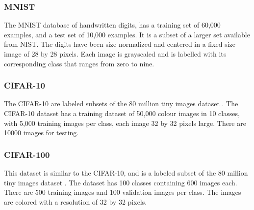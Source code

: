 \subsubsection{MNIST}
The MNIST database \cite{lecun-mnisthandwrittendigit-2010} of handwritten digits, has a training set of 60,000 examples, and a test set of 10,000 examples. It is a subset of a larger set available from NIST. The digits have been size-normalized and centered in a fixed-size image of 28 by 28 pixels. Each image is grayscaled and is labelled with its corresponding class that ranges from zero to nine.

\newline
\subsubsection{CIFAR-10}
The CIFAR-10 are labeled subsets of the 80 million tiny images dataset \cite{Torralba:2008:MTI:1444381.1444403}. The CIFAR-10 dataset has a training dataset of 50,000 colour images in 10 classes, with 5,000 training images per class, each image 32 by 32 pixels large. There are 10000 images for testing. 
\newline
\subsubsection{CIFAR-100}
This dataset is similar to the CIFAR-10, and is a labeled subset of the 80 million tiny images dataset \cite{Torralba:2008:MTI:1444381.1444403}. The dataset has 100 classes containing 600 images each. There are 500 training images and 100 validation images per class. The images are colored with a resolution of 32 by 32 pixels.

